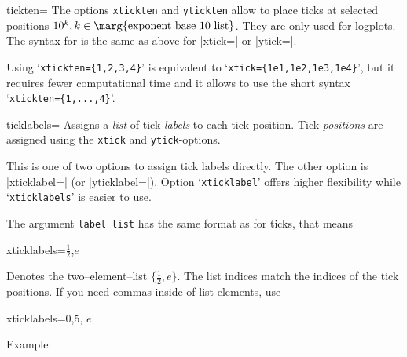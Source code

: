 \begin{pgfplotsxykey}{\x tickten=}
The options \texttt{xtickten} and \texttt{ytickten} allow to place ticks at selected positions $10^k, k \in \text{\marg{exponent base 10 list}}$. They are only used for logplots. The syntax for  is the same as above for |xtick=| or |ytick=|.

Using `\texttt{xtickten=\{1,2,3,4\}}' is equivalent to `\texttt{xtick=\{1e1,1e2,1e3,1e4\}}', but it requires fewer computational time and it allows to use the short syntax `\texttt{xtickten=\{1,...,4\}}'.
\begin{codeexample}[]
\end{codeexample}
\end{pgfplotsxykey}

\begin{pgfplotsxykey}{\x ticklabels=}
Assigns a \emph{list} of tick \emph{labels} to each tick position. Tick \emph{positions} are assigned using the \texttt{xtick} and \texttt{ytick}-options.

This is one of two options to assign tick labels directly. The other option is |xticklabel=| (or |yticklabel=|).
Option `\texttt{xticklabel}' offers higher flexibility while `\texttt{xticklabels}' is easier to use.

The argument \texttt{label list} has the same format as for ticks, that means
\begin{codeexample}
xticklabels={$\frac{1}{2}$,$e$}
\end{codeexample}
Denotes the two--element--list $\{\frac 12, e\}$. The list indices match the indices of the tick positions. If you need commas inside of list elements, use 
\begin{codeexample}
xticklabels={{0,5}, $e$}.
\end{codeexample}


Example:
\begin{codeexample}[]
\end{codeexample}
\end{pgfplotsxykey}


